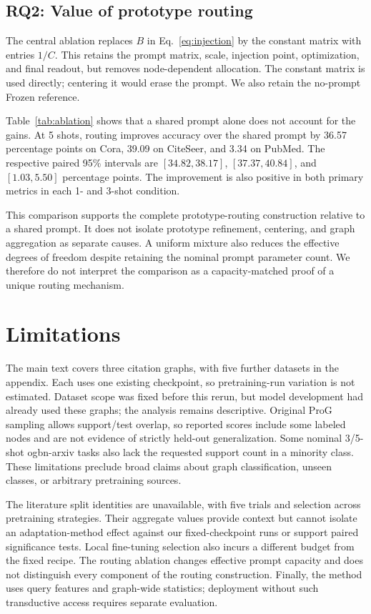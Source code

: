 \subsection{RQ2: Value of prototype routing}
The central ablation replaces $B$ in Eq.~\eqref{eq:injection} by the constant matrix with entries $1/C$. This retains the prompt matrix, scale, injection point, optimization, and final readout, but removes node-dependent allocation. The constant matrix is used directly; centering it would erase the prompt. We also retain the no-prompt Frozen reference.

Table~\ref{tab:ablation} shows that a shared prompt alone does not account for the gains. At 5 shots, routing improves accuracy over the shared prompt by 36.57 percentage points on Cora, 39.09 on CiteSeer, and 3.34 on PubMed. The respective paired 95\% intervals are $[34.82,38.17]$, $[37.37,40.84]$, and $[1.03,5.50]$ percentage points. The improvement is also positive in both primary metrics in each 1- and 3-shot condition.

This comparison supports the complete prototype-routing construction relative to a shared prompt. It does not isolate prototype refinement, centering, and graph aggregation as separate causes. A uniform mixture also reduces the effective degrees of freedom despite retaining the nominal prompt parameter count. We therefore do not interpret the comparison as a capacity-matched proof of a unique routing mechanism.

\section{Limitations}
The main text covers three citation graphs, with five further datasets in the appendix. Each uses one existing checkpoint, so pretraining-run variation is not estimated. Dataset scope was fixed before this rerun, but model development had already used these graphs; the analysis remains descriptive. Original ProG sampling allows support/test overlap, so reported scores include some labeled nodes and are not evidence of strictly held-out generalization. Some nominal 3/5-shot ogbn-arxiv tasks also lack the requested support count in a minority class. These limitations preclude broad claims about graph classification, unseen classes, or arbitrary pretraining sources.

The literature split identities are unavailable, with five trials and selection across pretraining strategies. Their aggregate values provide context but cannot isolate an adaptation-method effect against our fixed-checkpoint runs or support paired significance tests. Local fine-tuning selection also incurs a different budget from the fixed \method{} recipe. The routing ablation changes effective prompt capacity and does not distinguish every component of the routing construction. Finally, the method uses query features and graph-wide statistics; deployment without such transductive access requires separate evaluation.

